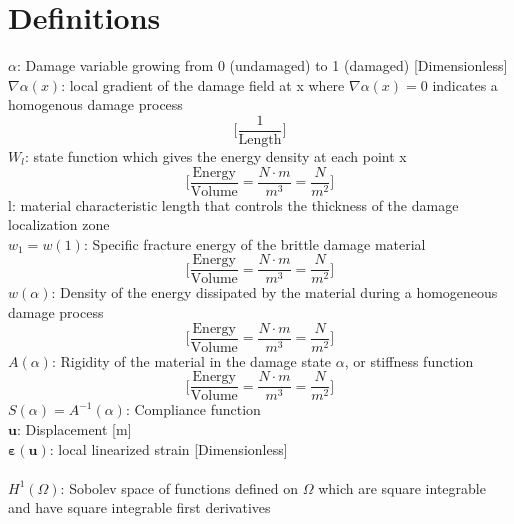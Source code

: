 \documentclass[12pt,3p]{article}
\numberwithin{equation}{section}
\begin{document}
\section{Definitions}
$\alpha$: Damage variable growing from 0 (undamaged) to 1 (damaged) [Dimensionless] \\
$\nabla \alpha (x)$: local gradient of the damage field at x where $\nabla \alpha(x) = 0$ indicates a homogenous damage process 
\begin{equation*}
\bigg[ \frac{1}{\text{Length}} \bigg] 
\end{equation*}
$W_l$: state function which gives the energy density at each point x 
\begin{equation*}
\bigg[ \frac{\text{Energy}}{\text{Volume}} = \frac{N \cdot m}{m^3} = \frac{N}{m^2} \bigg]
\end{equation*}
l: material characteristic length that controls the thickness of the damage localization zone \\
$w_1 = w(1)$: Specific fracture energy of the brittle damage material 
\begin{equation*}
\bigg[ \frac{\text{Energy}}{\text{Volume}} = \frac{N \cdot m}{m^3} = \frac{N}{m^2} \bigg]
\end{equation*}
$w(\alpha)$: Density of the energy dissipated by the material during a homogeneous damage process 
\begin{equation*}
\bigg[ \frac{\text{Energy}}{\text{Volume}} = \frac{N \cdot m}{m^3} = \frac{N}{m^2} \bigg]
\end{equation*}
$A(\alpha)$: Rigidity of the material in the damage state $\alpha$, or stiffness function
\begin{equation*}
\bigg[ \frac{\text{Energy}}{\text{Volume}} = \frac{N \cdot m}{m^3} = \frac{N}{m^2} \bigg]
\end{equation*}
 $S(\alpha) = A^{-1} (\alpha)$: Compliance function \\
$\textbf{u}$: Displacement [m] \\
$\boldsymbol{\varepsilon} (\mathbf{u})$: local linearized strain [Dimensionless] \\ \\
$H^{1} (\Omega)$: Sobolev space of functions defined on $\Omega$ which are square integrable and have square integrable first derivatives \\
\end{document}
